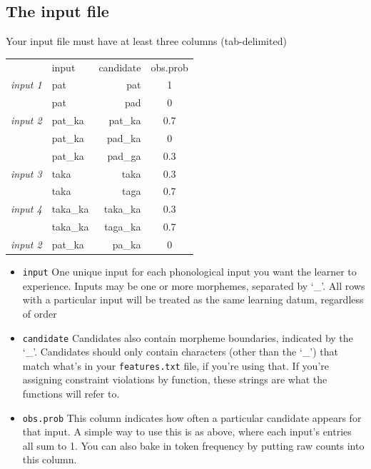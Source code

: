 \documentclass[12]{article}
\begin{document}
\subsection{The input file}

Your input file must have at least three columns (tab-delimited)

\begin{tabular}{r|l|r|c|}
	\cline{2-4}
	&input & candidate & obs.prob\\
	\cline{2-4}
	{\it input 1} & pat & pat & 1\\
			      & pat & pad & 0 \\
	\cline{2-4}
	{\it input 2} & pat\_ka & pat\_ka & 0.7 \\
			      & pat\_ka & pad\_ka & 0 \\
			      & pat\_ka & pad\_ga & 0.3\\
	\cline{2-4}
	{\it input 3} & taka & taka & 0.3 \\
				  & taka & taga & 0.7 \\
	\cline{2-4}
	{\it input 4} & taka\_ka & taka\_ka & 0.3 \\
				  & taka\_ka & taga\_ka & 0.7 \\
	\cline{2-4}
	{\it input 2} & pat\_ka  & pa\_ka	& 0 \\
	\cline{2-4}
	
\end{tabular}

\begin{itemize}
	\item \texttt{input} One unique input for each phonological input you want the learner to experience.  Inputs may be one or more morphemes, separated by `\_'.  All rows with a particular input will be treated as the same learning datum, regardless of order
	\item \texttt{candidate} Candidates also contain morpheme boundaries, indicated by the `\_'.  Candidates should only contain characters (other than the `\_') that match what's in your \texttt{features.txt} file, if you're using that.  If you're assigning constraint violations by function, these strings are what the functions will refer to.
	\item \texttt{obs.prob} This column indicates how often a particular candidate appears for that input.  A simple way to use this is as above, where each input's entries all sum to 1.  You can also bake in token frequency by putting raw counts into this column.
\end{itemize}
\end{document}

